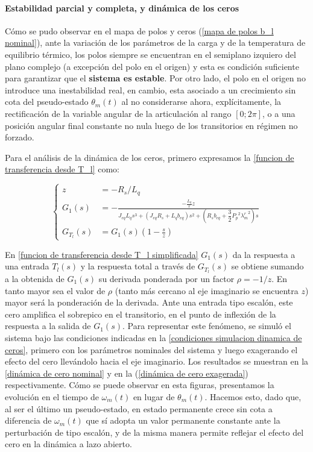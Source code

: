 \documentclass[a4paper, 10pt, onecolumn,journal]{ieeeconf}
\begin{document}
\paragraph{\textbf{Estabilidad parcial y completa, y dinámica de los ceros}}
Cómo se pudo observar en el mapa de polos y ceros (\cref{mapa de polos b_l nominal}),  ante la variación de los parámetros de la carga
y de la temperatura de equilibrio térmico, los polos siempre se encuentran
en el semiplano izquiero del plano complejo (a excepción del polo en el origen) y esta es condición suficiente para
garantizar que el \textbf{sistema es estable}. Por otro lado, el polo en el origen no introduce una inestabilidad real, 
en cambio, esta asociado a un crecimiento sin cota del pseudo-estado $\theta_m(t)$ al no considerarse ahora, explícitamente,
la rectificación de la variable angular de la articulación al rango  $[0;2\pi]$, o a una posición angular final constante no nula
luego de los transitorios en régimen no forzado.

Para el análisis de la dinámica de los ceros, primero %
expresamos la \cref{funcion de transferencia desde T_l}
como:

\begin{equation}
    \begin{cases}
        z &= -R_s/L_q\\
        G_1(s) &= -\frac{-\frac{L_q}{r}z}{J_{eq} L_{q} s^3 +\left( J_{eq} R_{s} + L_{q} b_{eq} \right)s^2 + \left( R_{s} b_{eq} + \dfrac{3}{2} {P_{p}}^2 { \lambda^r_m}^2\right) s}\\
	    G_{T_l}(s) &= G_1(s)\left( 1 - \frac{s}{z}\right)
    \end{cases}
	\label{funcion de transferencia desde T_l simplificada}
\end{equation}

En \cref{funcion de transferencia desde T_l simplificada} $G_1(s)$ da la respuesta a una entrada $T_l(s)$
y la respuesta total a través de $G_{T_l}(s)$ se obtiene sumando a la obtenida de $G_1(s)$ su derivada
ponderada por un factor $\rho = -1/z$. En tanto mayor sea el valor de $\rho$ (tanto más cercano al eje imaginario se encuentra $z$)\cite{c1}
mayor será la ponderación de la derivada. Ante una entrada tipo escalón,
este cero amplifica el sobrepico en el transitorio, en el punto de inflexión de la respuesta a la salida de 
$G_1(s)$. Para representar este fenómeno, se simuló el sistema bajo las condiciones indicadas en la \cref{condiciones simulacion dinamica de ceros},
primero con los parámetros nominales del sistema y luego exagerando
el efecto del cero llevándolo hacia el eje imaginario. Los resultados se muestran en la \cref{dinámica de cero nominal} y en la (\cref{dinámica de cero exagerada}) respectivamente.
Cómo se puede observar en esta figuras, presentamos la evolución en el tiempo de $\omega_m(t)$ en lugar de $\theta_m(t)$.
Hacemos esto, dado que, al ser el último un pseudo-estado, en estado permanente crece sin cota a diferencia de $\omega_m(t)$ que sí adopta un valor permanente constante ante la perturbación de tipo escalón, y de la misma
manera permite reflejar el efecto del cero en la dinámica a lazo abierto.
\end{document}
